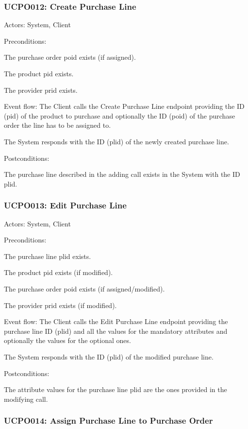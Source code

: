 \subsubsection{UCPO012: Create Purchase Line}
\label{UCPO012}

Actors: System, Client

Preconditions:

\ucitem The purchase order poid exists (if assigned).

\ucitem The product pid exists.

\ucitem The provider prid exists.

Event flow:
\ucitem The Client calls the Create Purchase Line endpoint providing the ID (pid) of the product to purchase and optionally the ID (poid) of the purchase order the line has to be 
assigned to.

\ucitem The System responds with the ID (plid) of the newly created purchase line.

Postconditions:

\ucitem The purchase line described in the adding call exists in the System with the ID plid.

\subsubsection{UCPO013: Edit Purchase Line}
\label{UCPO013}

Actors: System, Client

Preconditions:

\ucitem The purchase line plid exists.

\ucitem The product pid exists (if modified).

\ucitem The purchase order poid exists (if assigned/modified).

\ucitem The provider prid exists (if modified).

Event flow:
\ucitem The Client calls the Edit Purchase Line endpoint providing the purchase line ID (plid) and all the values for the mandatory attributes and optionally the values for the 
optional ones.

\ucitem The System responds with the ID (plid) of the modified purchase line.

Postconditions:

\ucitem The attribute values for the purchase line plid are the ones provided in the modifying call.

\subsubsection{UCPO014: Assign Purchase Line to Purchase Order}
\label{UCPO014}

